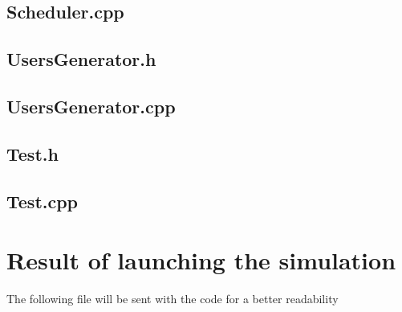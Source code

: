 \documentclass [10 pt, a4 paper]{report}
\begin{document}
\subsection{Scheduler.cpp}


\subsection{UsersGenerator.h}

\subsection{UsersGenerator.cpp}


\subsection{Test.h}

\subsection{Test.cpp}




\clearpage
\section{Result of launching the simulation}
The following file will be sent with the code for a better readability
\end{document}
